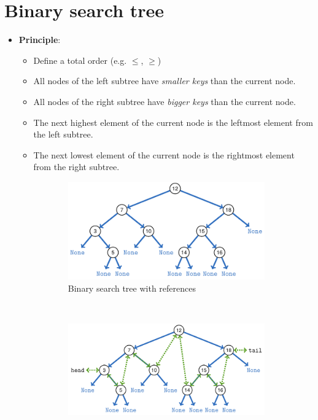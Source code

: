 \documentclass[12pt, a4paper]{scrartcl}
\begin{document}
\section{Binary search tree}
\label{sec:binary_search_tree}
\begin{itemize}
\item \textbf{Principle}:
  \begin{itemize}
  \item Define a total order (e.g. $\le$, $\ge$)
  \item All nodes of the left subtree have \emph{smaller keys} than the current node.
  \item All nodes of the right subtree have \emph{bigger keys} than the current node.
  \item The next highest element of the current node is the leftmost element from the left subtree.
  \item The next lowest element of the current node is the rightmost element from the right subtree.
  \end{itemize}
  \begin{figure}[htbp]
    \centering
    \begin{subfigure}[b]{.4\textwidth}
      \includegraphics[width=\textwidth]{search_tree_ref}
      \caption{Binary search tree with references}
      \label{fig:binary_search_tree}
    \end{subfigure}
    ~
    \begin{subfigure}[b]{.47\textwidth}
      \includegraphics[width=\textwidth]{search_tree_linked}

\end{subfigure}
\end{figure}
\end{itemize}
\end{document}
